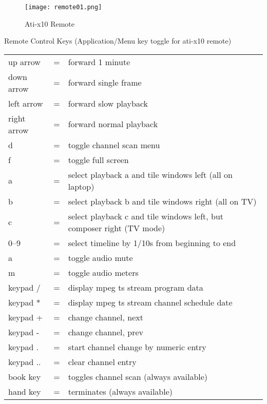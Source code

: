 \begin{figure}[htpb]
	\centering
	\texttt{[image: remote01.png]}
	\caption{Ati-x10 Remote}
	\label{fig:remote01}
\end{figure}

Remote Control Keys (Application/Menu key toggle for ati-x10 remote)

\begin{tabular}{lc p{12cm}}
	\toprule
    up arrow&=&forward 1 minute\\
    
    down arrow&=&forward single frame\\
    
    left arrow&=&forward slow playback\\
    
    right arrow&=&forward normal playback\\
    
    d&=&toggle channel scan menu\\
    
    f&=&toggle full screen\\
    
    a&=&select playback a and tile windows left (all on laptop)\\
    
    b&=&select playback b and tile windows right (all on TV)\\
    
    c&=&select playback c and tile windows left, but composer right (TV mode)\\
    
    0--9&=&select timeline by 1/10s from beginning to end\\
    
    a&=&toggle audio mute\\
    
    m&=&toggle audio meters\\
    
    keypad /&=&display mpeg ts stream program data\\
    
    keypad *&=&display mpeg ts stream channel schedule date\\
    
    keypad +&=&change channel, next\\
    
    keypad -&=&change channel, prev\\
    
    keypad .&=&start channel change by numeric entry\\
    
    keypad ..&=&clear channel entry\\
    
    book key&=&toggles channel scan (always available)\\
    
    hand key&=&terminates \CGG{} (always available)\\ 
    \bottomrule 
\end{tabular}

